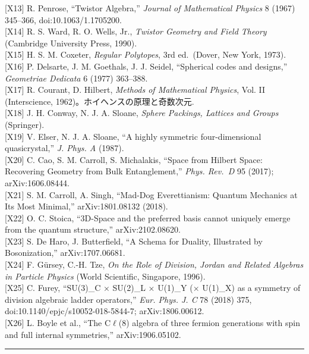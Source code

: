 \documentclass[
  a4paper,
]{ltjsarticle}
\begin{document}
{[}X13{]} R. Penrose, ``Twistor Algebra,'' \emph{Journal of Mathematical
Physics} 8 (1967) 345--366, doi:10.1063/1.1705200.\\
{[}X14{]} R. S. Ward, R. O. Wells, Jr., \emph{Twistor Geometry and Field
Theory} (Cambridge University Press, 1990).\\
{[}X15{]} H. S. M. Coxeter, \emph{Regular Polytopes}, 3rd ed.~(Dover,
New York, 1973).\\
{[}X16{]} P. Delsarte, J. M. Goethals, J. J. Seidel, ``Spherical codes
and designs,'' \emph{Geometriae Dedicata} 6 (1977) 363--388.\\
{[}X17{]} R. Courant, D. Hilbert, \emph{Methods of Mathematical
Physics}, Vol. II (Interscience, 1962)。ホイヘンスの原理と奇数次元.\\
{[}X18{]} J. H. Conway, N. J. A. Sloane, \emph{Sphere Packings, Lattices
and Groups} (Springer).\\
{[}X19{]} V. Elser, N. J. A. Sloane, ``A highly symmetric
four-dimensional quasicrystal,'' \emph{J. Phys. A} (1987).\\
{[}X20{]} C. Cao, S. M. Carroll, S. Michalakis, ``Space from Hilbert
Space: Recovering Geometry from Bulk Entanglement,'' \emph{Phys. Rev.~D}
95 (2017); arXiv:1606.08444.\\
{[}X21{]} S. M. Carroll, A. Singh, ``Mad-Dog Everettianism: Quantum
Mechanics at Its Most Minimal,'' arXiv:1801.08132 (2018).\\
{[}X22{]} O. C. Stoica, ``3D-Space and the preferred basis cannot
uniquely emerge from the quantum structure,'' arXiv:2102.08620.\\
{[}X23{]} S. De Haro, J. Butterfield, ``A Schema for Duality,
Illustrated by Bosonization,'' arXiv:1707.06681.\\
{[}X24{]} F. Gürsey, C.-H. Tze, \emph{On the Role of Division, Jordan
and Related Algebras in Particle Physics} (World Scientific, Singapore,
1996).\\
{[}X25{]} C. Furey, ``SU(3)\_C × SU(2)\_L × U(1)\_Y (× U(1)\_X) as a
symmetry of division algebraic ladder operators,'' \emph{Eur. Phys. J.
C} 78 (2018) 375, doi:10.1140/epjc/s10052-018-5844-7;
arXiv:1806.00612.\\
{[}X26{]} L. Boyle et al., ``The C\(\ell\)(8) algebra of three fermion
generations with spin and full internal symmetries,'' arXiv:1906.05102.

\begin{center}\rule{0.5\linewidth}{0.5pt}\end{center}
\end{document}
